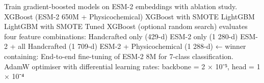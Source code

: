 {}
\markdownRendererSectionEnd \markdownRendererSectionBegin
{}\markdownRendererInterblockSeparator
{} Train gradient-boosted models on ESM-2 embeddings with ablation study.\markdownRendererParagraphSeparator
{}\markdownRendererInterblockSeparator
{}\markdownRendererOlBeginTight
{}XGBoost (ESM-2 650M + Physicochemical)\markdownRendererOlItemEnd 
{}XGBoost with SMOTE\markdownRendererOlItemEnd 
{}LightGBM\markdownRendererOlItemEnd 
{}LightGBM with SMOTE\markdownRendererOlItemEnd 
{}Tuned XGBoost (optional random search)\markdownRendererOlItemEnd 
\markdownRendererOlEndTight \markdownRendererInterblockSeparator
{} evaluates four feature combinations:\markdownRendererInterblockSeparator
{}\markdownRendererUlBeginTight
\markdownRendererUlItem Handcrafted only (429-d)\markdownRendererUlItemEnd 
\markdownRendererUlItem ESM-2 only (1 280-d)\markdownRendererUlItemEnd 
\markdownRendererUlItem ESM-2 + all Handcrafted (1 709-d)\markdownRendererUlItemEnd 
\markdownRendererUlItem ESM-2 + Physicochemical (1 288-d) ← winner\markdownRendererUlItemEnd 
\markdownRendererUlEndTight \markdownRendererInterblockSeparator
{}  containing:\markdownRendererInterblockSeparator
{}\markdownRendererInterblockSeparator
{}\markdownRendererThematicBreak{}\markdownRendererInterblockSeparator
{}
\markdownRendererSectionEnd \markdownRendererSectionBegin
{}\markdownRendererInterblockSeparator
{} End-to-end fine-tuning of ESM-2 8M for 7-class classification.\markdownRendererParagraphSeparator
{}\markdownRendererInterblockSeparator
{}\markdownRendererInterblockSeparator
{}\markdownRendererInterblockSeparator
{}\markdownRendererUlBeginTight
\markdownRendererUlItem AdamW optimiser with differential learning rates: backbone = 2 × 10⁻⁵, head = 1 × 10⁻⁴\markdownRendererUlItemEnd 
